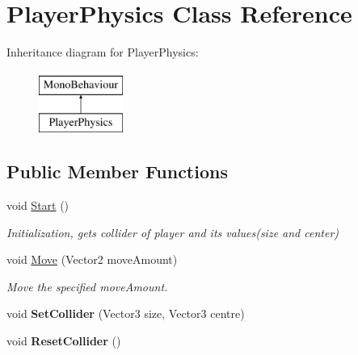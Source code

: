 \hypertarget{classPlayerPhysics}{\section{Player\-Physics Class Reference}
\label{classPlayerPhysics}
}
Inheritance diagram for Player\-Physics\-:\begin{figure}[H]
\begin{center}
\leavevmode
\includegraphics[height=2.000000cm]{classPlayerPhysics}
\end{center}
\end{figure}
\subsection*{Public Member Functions}
\begin{DoxyCompactItemize}
\item 
void \hyperlink{classPlayerPhysics_a99b303d3104f7989b449e5b5398bc568}{Start} ()
\begin{DoxyCompactList}\small\item\em Initialization, gets collider of player and its values(size and center) \end{DoxyCompactList}\item 
void \hyperlink{classPlayerPhysics_adb50fbe957788574388514fce1dc5d89}{Move} (Vector2 move\-Amount)
\begin{DoxyCompactList}\small\item\em Move the specified move\-Amount. \end{DoxyCompactList}\item 
\hypertarget{classPlayerPhysics_a097b184f0e6479d3b6d58a4ac03be0a3}{void {\bfseries Set\-Collider} (Vector3 size, Vector3 centre)}\label{classPlayerPhysics_a097b184f0e6479d3b6d58a4ac03be0a3}

\item 
\hypertarget{classPlayerPhysics_a24ed69f034983045687bddc989754878}{void {\bfseries Reset\-Collider} ()}\label{classPlayerPhysics_a24ed69f034983045687bddc989754878}

\end{DoxyCompactItemize}
